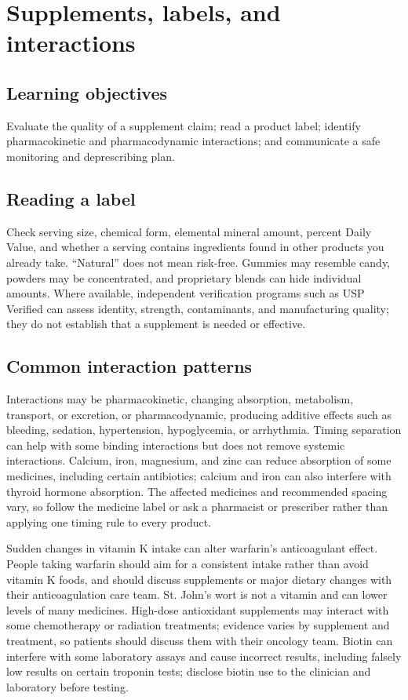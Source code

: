 \chapter{Supplements, labels, and interactions}
\section{Learning objectives}
Evaluate the quality of a supplement claim; read a product label; identify pharmacokinetic and pharmacodynamic interactions; and communicate a safe monitoring and deprescribing plan.

\section{Reading a label}
Check serving size, chemical form, elemental mineral amount, percent Daily Value, and whether a serving contains ingredients found in other products you already take. ``Natural'' does not mean risk-free. Gummies may resemble candy, powders may be concentrated, and proprietary blends can hide individual amounts. Where available, independent verification programs such as USP Verified can assess identity, strength, contaminants, and manufacturing quality; they do not establish that a supplement is needed or effective. \cite{fdaSupplements,uspVerified}

\section{Common interaction patterns}
Interactions may be pharmacokinetic, changing absorption, metabolism, transport, or excretion, or pharmacodynamic, producing additive effects such as bleeding, sedation, hypertension, hypoglycemia, or arrhythmia. Timing separation can help with some binding interactions but does not remove systemic interactions.
Calcium, iron, magnesium, and zinc can reduce absorption of some medicines, including certain antibiotics; calcium and iron can also interfere with thyroid hormone absorption. The affected medicines and recommended spacing vary, so follow the medicine label or ask a pharmacist or prescriber rather than applying one timing rule to every product. \cite{odsCa,odsIron,odsMg,odsZinc}

Sudden changes in vitamin K intake can alter warfarin's anticoagulant effect. People taking warfarin should aim for a consistent intake rather than avoid vitamin K foods, and should discuss supplements or major dietary changes with their anticoagulation care team. St. John's wort is not a vitamin and can lower levels of many medicines. High-dose antioxidant supplements may interact with some chemotherapy or radiation treatments; evidence varies by supplement and treatment, so patients should discuss them with their oncology team. Biotin can interfere with some laboratory assays and cause incorrect results, including falsely low results on certain troponin tests; disclose biotin use to the clinician and laboratory before testing. \cite{odsK,odsSafety,nciCancerInteractions,fdaBiotin}

